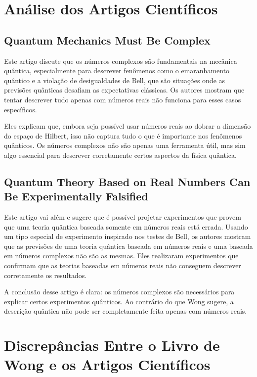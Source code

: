 \documentclass[article]{abntex2}
\begin{document}
\section{Análise dos Artigos Científicos}
\thispagestyle{plain}

\subsection{Quantum Mechanics Must Be Complex}

Este artigo discute que os números complexos são fundamentais na mecânica quântica, especialmente para descrever fenômenos como o emaranhamento quântico e a violação de desigualdades de Bell, que são situações onde as previsões quânticas desafiam as expectativas clássicas. Os autores mostram que tentar descrever tudo apenas com números reais não funciona para esses casos específicos.

Eles explicam que, embora seja possível usar números reais ao dobrar a dimensão do espaço de Hilbert, isso não captura tudo o que é importante nos fenômenos quânticos. Os números complexos não são apenas uma ferramenta útil, mas sim algo essencial para descrever corretamente certos aspectos da física quântica. \cite{avella2022quantum}

\subsection{Quantum Theory Based on Real Numbers Can Be Experimentally Falsified}

Este artigo vai além e sugere que é possível projetar experimentos que provem que uma teoria quântica baseada somente em números reais está errada. Usando um tipo especial de experimento inspirado nos testes de Bell, os autores mostram que as previsões de uma teoria quântica baseada em números reais e uma baseada em números complexos não são as mesmas. Eles realizaram experimentos que confirmam que as teorias baseadas em números reais não conseguem descrever corretamente os resultados.

A conclusão desse artigo é clara: os números complexos são necessários para explicar certos experimentos quânticos. Ao contrário do que Wong sugere, a descrição quântica não pode ser completamente feita apenas com números reais. \cite{renou2021quantum}

\section{Discrepâncias Entre o Livro de Wong e os Artigos Científicos}
\thispagestyle{plain}
\end{document}
